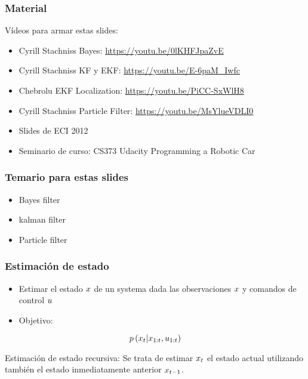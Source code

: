 \begin{frame}
    \frametitle{Material}
    
    Vídeos para armar estas slides:
    \begin{itemize}
        \item Cyrill Stachniss Bayes: \url{https://youtu.be/0lKHFJpaZvE}
        \item Cyrill Stachniss KF y EKF: \url{https://youtu.be/E-6paM_Iwfc}
        \item Chebrolu EKF Localization: \url{https://youtu.be/PiCC-SxWlH8}
        \item Cyrill Stachniss Particle Filter: \url{https://youtu.be/MsYlueVDLI0}
        \item Slides de ECI 2012
        \item Seminario de curso: CS373 Udacity Programming a Robotic Car
    \end{itemize}
    
\end{frame}

\begin{frame}
    \frametitle{Temario para estas slides}
    
    \begin{itemize}
        \item Bayes filter
        \item kalman filter
        \item Particle filter
    \end{itemize}
    
    
\end{frame}

\begin{frame}
	\frametitle{Estimación de estado}
	
	
	\begin{itemize}
		\item  Estimar el estado $x$ de un systema dada las observaciones $x$ y comandos de control $u$
		\item Objetivo:
	\end{itemize}
	
	\begin{equation}
		p\left(x_{t} | x_{1:t}, u_{1:t} \right)
	\end{equation}
	
	Estimación de estado recursiva: Se trata de estimar $x_{t}$ el estado actual utilizando también el estado inmediatamente anterior $x_{t-1}$.
\end{frame}

